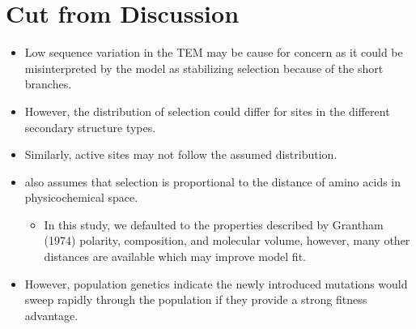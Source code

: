 \documentclass[12pt]{article}
\begin{document}
\section*{Cut from Discussion}
\begin{itemize}
\item Low sequence variation in the TEM may be cause for concern as it could be misinterpreted by the model as stabilizing selection because of the short branches.
\item However, the distribution of selection could differ for sites in the different secondary structure types.
\item Similarly, active sites may not follow the assumed distribution.
\item \selac also assumes that selection is proportional to the distance of amino acids in physicochemical space.
  \begin{itemize}
  \item In this study, we defaulted to the properties described by Grantham (1974) polarity, composition, and molecular volume, however, many other distances are available which may improve model fit.
  \end{itemize}
\item However, population genetics indicate the newly introduced mutations would sweep rapidly through the population if they provide a strong fitness advantage.  
\end{itemize}

 
\end{document}
